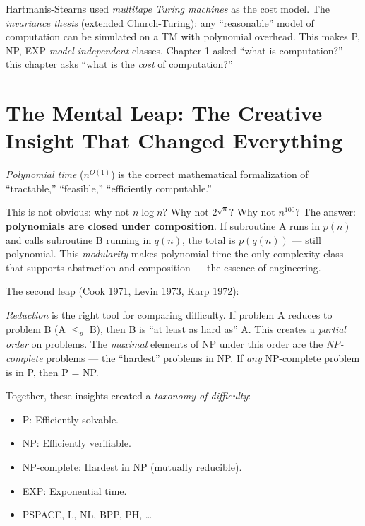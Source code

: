 Hartmanis-Stearns used \emph{multitape Turing machines} as the cost model. The \emph{invariance thesis} (extended Church-Turing): any ``reasonable'' model of computation can be simulated on a TM with polynomial overhead. This makes P, NP, EXP \emph{model-independent} classes. Chapter 1 asked ``what is computation?'' — this chapter asks ``what is the \emph{cost} of computation?''

\section{The Mental Leap: The Creative Insight That Changed Everything}
\label{sec:complexity:leap}

\emph{Polynomial time} ($n^{O(1)}$) is the correct mathematical formalization of ``tractable,'' ``feasible,'' ``efficiently computable.''

This is not obvious: why not $n \log n$? Why not $2^{\sqrt{n}}$? Why not $n^{100}$? The answer: \textbf{polynomials are closed under composition}. If subroutine A runs in $p(n)$ and calls subroutine B running in $q(n)$, the total is $p(q(n))$ — still polynomial. This \emph{modularity} makes polynomial time the only complexity class that supports abstraction and composition — the essence of engineering.

The second leap (Cook 1971, Levin 1973, Karp 1972):

\emph{Reduction} is the right tool for comparing difficulty. If problem A reduces to problem B (A $\le_p$ B), then B is ``at least as hard as'' A. This creates a \emph{partial order} on problems. The \emph{maximal} elements of NP under this order are the \emph{NP-complete} problems — the ``hardest'' problems in NP. If \emph{any} NP-complete problem is in P, then P = NP.

Together, these insights created a \emph{taxonomy of difficulty}:
\begin{itemize}
\item P: Efficiently solvable.
\item NP: Efficiently verifiable.
\item NP-complete: Hardest in NP (mutually reducible).
\item EXP: Exponential time.
\item PSPACE, L, NL, BPP, PH, \dots
\end{itemize}


